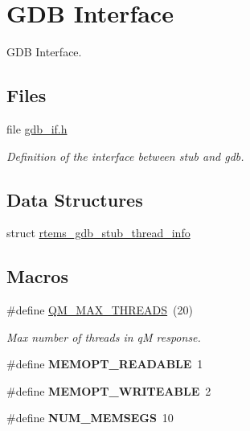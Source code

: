 \hypertarget{group__mips__gdb}{}\section{G\+DB Interface}
\label{group__mips__gdb}


G\+DB Interface.  


\subsection*{Files}
\begin{DoxyCompactItemize}
\item 
file \mbox{\hyperlink{mips_2shared_2gdbstub_2gdb__if_8h}{gdb\+\_\+if.\+h}}
\begin{DoxyCompactList}\small\item\em Definition of the interface between stub and gdb. \end{DoxyCompactList}\end{DoxyCompactItemize}
\subsection*{Data Structures}
\begin{DoxyCompactItemize}
\item 
struct \mbox{\hyperlink{structrtems__gdb__stub__thread__info}{rtems\+\_\+gdb\+\_\+stub\+\_\+thread\+\_\+info}}
\end{DoxyCompactItemize}
\subsection*{Macros}
\begin{DoxyCompactItemize}
\item 
\mbox{\label{group__mips__gdb_ga243f95627d5e272d7fec12c5b9431fb0}} 
\#define \mbox{\hyperlink{group__mips__gdb_ga243f95627d5e272d7fec12c5b9431fb0}{Q\+M\+\_\+\+M\+A\+X\+\_\+\+T\+H\+R\+E\+A\+DS}}~(20)
\begin{DoxyCompactList}\small\item\em Max number of threads in qM response. \end{DoxyCompactList}\item 
\mbox{\label{group__mips__gdb_gac6558f37b58f34275d825efca8d73400}} 
\#define {\bfseries M\+E\+M\+O\+P\+T\+\_\+\+R\+E\+A\+D\+A\+B\+LE}~1
\item 
\mbox{\label{group__mips__gdb_gaec08071bf03b1f6f0fe98269da79e8db}} 
\#define {\bfseries M\+E\+M\+O\+P\+T\+\_\+\+W\+R\+I\+T\+E\+A\+B\+LE}~2
\item 
\mbox{\label{group__mips__gdb_ga71efcf50dccca194d959215e74055002}} 
\#define {\bfseries N\+U\+M\+\_\+\+M\+E\+M\+S\+E\+GS}~10
\end{DoxyCompactItemize}
